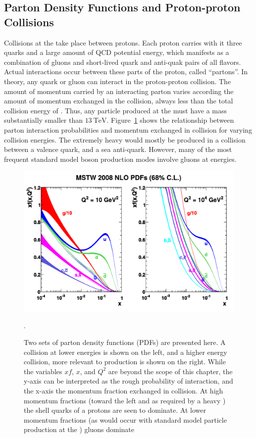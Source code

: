 \subsection{Parton Density Functions and Proton-proton Collisions}
Collisions at the \LHC take place between protons. Each proton carries with it three quarks and a large amount of QCD potential energy, which manifests as a combination of gluons and short-lived quark and anti-quak pairs of all flavors. Actual interactions occur between these parts of the proton, called ``partons''. In theory, any quark or gluon can interact in the proton-proton collision. The amount of momentum carried by an interacting parton varies according the amount of momentum exchanged in the collision, always less than the total collision energy of \rootsthirteen. Thus, any particle produced at the \LHC must have a mass substantially smaller than \ensuremath{\SI{13}{\TeV}}. Figure~\ref{fig:proton_pdfs} shows the relationship between parton interaction probabilities and momentum exchanged in collision for varying collision energies. The extremely heavy \WR would mostly be produced in a collision between a valence quark, and a sea anti-quark. However, many of the most frequent standard model boson production modes involve gluons at \LHC energies.
\begin{figure}[!btp]
    \centering
    \includegraphics[width=\textwidth]{figures/mstw_pdfs.pdf}
    \caption[Proton PDFs at the \LHC]
       {Two sets of parton density functions (PDFs) are presented here. A collision at lower energies is shown on the left, and a higher energy collision, more relevant to \WR production is shown on the right. While the variables $xf$, $x$, and $Q^2$ are beyond the scope of this chapter, the y-axis can be interpreted as the rough probability of interaction, and the x-axis the momentum fraction exchanged in collision. At high momentum fractions (toward the left and as required by a heavy \WR) the shell quarks of a protons are seen to dominate. At lower momentum fractions (as would occur with standard model particle production at the \LHC) gluons dominate \cite{PDFExample}}. 
    \label{fig:proton_pdfs}
\end{figure}

